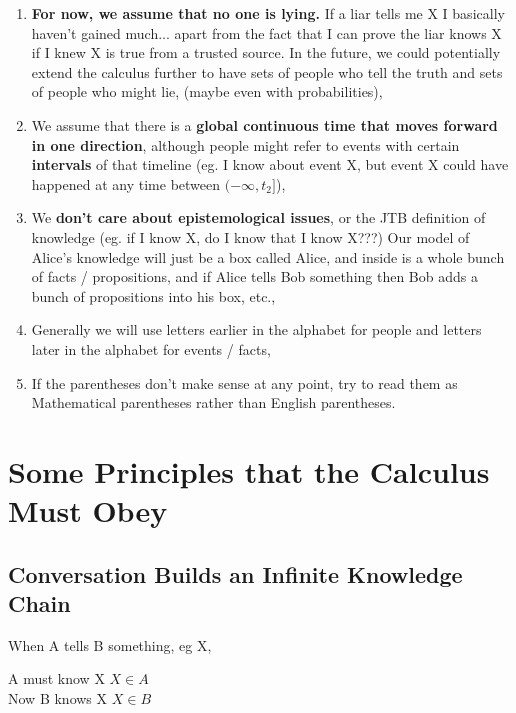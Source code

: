 \documentclass[12pt,a4paper]{article}
\begin{document}
\begin{enumerate}
\item \textbf{For now, we assume that no one is lying.} If a liar tells me X I basically haven't gained much... apart from the fact that I can prove the liar knows X if I knew X is true from a trusted source. In the future, we could potentially extend the calculus further to have sets of people who tell the truth and sets of people who might lie, (maybe even with probabilities),

\item We assume that there is a \textbf{global continuous time that moves forward in one direction}, although people might refer to events with certain \textbf{intervals} of that timeline (eg. I know about event X, but event X could have happened at any time between $(-\infty, t_2]$),

\item We \textbf{don't care about epistemological issues}, or the JTB definition of knowledge (eg. if I know X, do I know that I know X???) Our model of Alice's knowledge will just be a box called Alice, and inside is a whole bunch of facts / propositions, and if Alice tells Bob something then Bob adds a bunch of propositions into his box, etc.,

\item Generally we will use letters earlier in the alphabet for people and letters later in the alphabet for events / facts,

\item If the parentheses don't make sense at any point, try to read them as Mathematical parentheses rather than English parentheses. 


\end{enumerate}

\section{Some Principles that the Calculus Must Obey}

\subsection{Conversation Builds an Infinite Knowledge Chain}
When A tells B something, eg X, 

A must know X $X \in A$ \\

Now B knows X $X \in B$ \\
\end{document}
